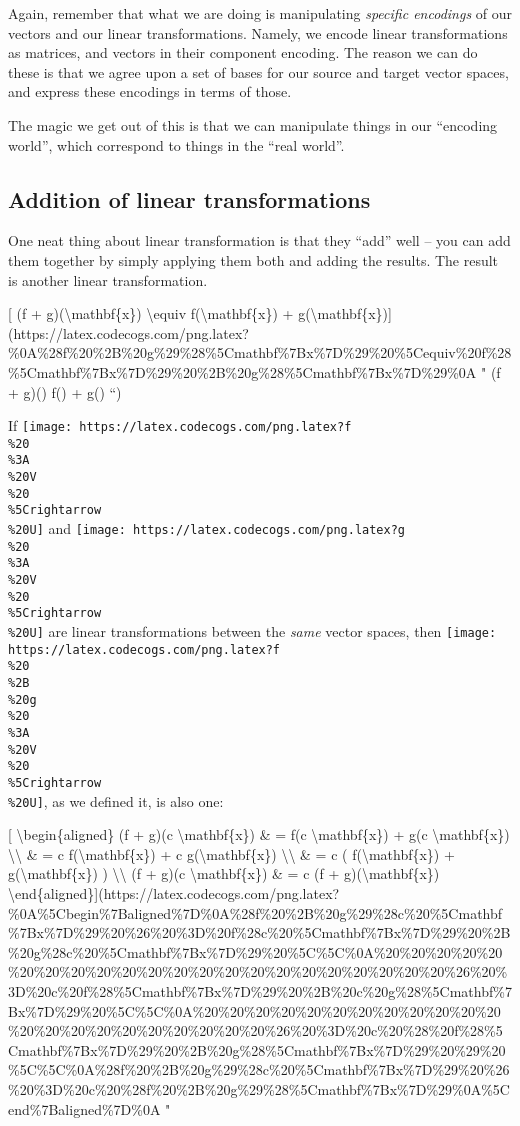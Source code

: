 \documentclass[]{article}
\begin{document}
Again, remember that what we are doing is manipulating \emph{specific encodings}
of our vectors and our linear transformations. Namely, we encode linear
transformations as matrices, and vectors in their component encoding. The reason
we can do these is that we agree upon a set of bases for our source and target
vector spaces, and express these encodings in terms of those.

The magic we get out of this is that we can manipulate things in our ``encoding
world'', which correspond to things in the ``real world''.

\hypertarget{addition-of-linear-transformations}{%
\subsection{Addition of linear
transformations}\label{addition-of-linear-transformations}}

One neat thing about linear transformation is that they ``add'' well -- you can
add them together by simply applying them both and adding the results. The
result is another linear transformation.

{[} (f + g)(\textbackslash{}mathbf\{x\}) \textbackslash{}equiv
f(\textbackslash{}mathbf\{x\}) +
g(\textbackslash{}mathbf\{x\}){]}(https://latex.codecogs.com/png.latex?\%0A\%28f\%20\%2B\%20g\%29\%28\%5Cmathbf\%7Bx\%7D\%29\%20\%5Cequiv\%20f\%28\%5Cmathbf\%7Bx\%7D\%29\%20\%2B\%20g\%28\%5Cmathbf\%7Bx\%7D\%29\%0A
" (f + g)() \equiv f() + g() ``)

If
\texttt{[image: https://latex.codecogs.com/png.latex?f\\\%20\\\%3A\\\%20V\\\%20\\\%5Crightarrow\\\%20U]}
and
\texttt{[image: https://latex.codecogs.com/png.latex?g\\\%20\\\%3A\\\%20V\\\%20\\\%5Crightarrow\\\%20U]}
are linear transformations between the \emph{same} vector spaces, then
\texttt{[image: https://latex.codecogs.com/png.latex?f\\\%20\\\%2B\\\%20g\\\%20\\\%3A\\\%20V\\\%20\\\%5Crightarrow\\\%20U]},
as we defined it, is also one:

{[} \textbackslash{}begin\{aligned\} (f + g)(c \textbackslash{}mathbf\{x\}) \& =
f(c \textbackslash{}mathbf\{x\}) + g(c \textbackslash{}mathbf\{x\})
\textbackslash{}\textbackslash{} \& = c f(\textbackslash{}mathbf\{x\}) + c
g(\textbackslash{}mathbf\{x\}) \textbackslash{}\textbackslash{} \& = c (
f(\textbackslash{}mathbf\{x\}) + g(\textbackslash{}mathbf\{x\}) )
\textbackslash{}\textbackslash{} (f + g)(c \textbackslash{}mathbf\{x\}) \& = c
(f + g)(\textbackslash{}mathbf\{x\})
\textbackslash{}end\{aligned\}{]}(https://latex.codecogs.com/png.latex?\%0A\%5Cbegin\%7Baligned\%7D\%0A\%28f\%20\%2B\%20g\%29\%28c\%20\%5Cmathbf\%7Bx\%7D\%29\%20\%26\%20\%3D\%20f\%28c\%20\%5Cmathbf\%7Bx\%7D\%29\%20\%2B\%20g\%28c\%20\%5Cmathbf\%7Bx\%7D\%29\%20\%5C\%5C\%0A\%20\%20\%20\%20\%20\%20\%20\%20\%20\%20\%20\%20\%20\%20\%20\%20\%20\%20\%20\%20\%20\%20\%26\%20\%3D\%20c\%20f\%28\%5Cmathbf\%7Bx\%7D\%29\%20\%2B\%20c\%20g\%28\%5Cmathbf\%7Bx\%7D\%29\%20\%5C\%5C\%0A\%20\%20\%20\%20\%20\%20\%20\%20\%20\%20\%20\%20\%20\%20\%20\%20\%20\%20\%20\%20\%20\%20\%26\%20\%3D\%20c\%20\%28\%20f\%28\%5Cmathbf\%7Bx\%7D\%29\%20\%2B\%20g\%28\%5Cmathbf\%7Bx\%7D\%29\%20\%29\%20\%5C\%5C\%0A\%28f\%20\%2B\%20g\%29\%28c\%20\%5Cmathbf\%7Bx\%7D\%29\%20\%26\%20\%3D\%20c\%20\%28f\%20\%2B\%20g\%29\%28\%5Cmathbf\%7Bx\%7D\%29\%0A\%5Cend\%7Baligned\%7D\%0A
"
\end{document}
